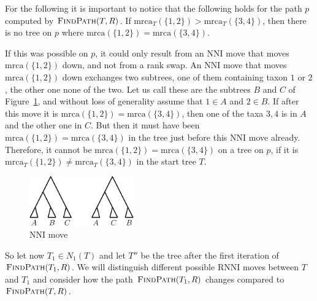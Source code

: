 \documentclass{amsart}
\newcommand{\rnni}{\mathrm{RNNI}}
\newcommand{\findpath}{\textsc{FindPath}}
\newcommand{\mrca}{\mathrm{mrca}}
\newcommand{\nni}{\mathrm{NNI}}
\begin{document}
For the following it is important to notice that the following holds for the path $p$ computed by $\findpath(T,R)$.
If $\mrca_T(\{1,2\}) > \mrca_T(\{3,4\})$, then there is no tree on $p$ where $\mrca(\{1,2\}) = \mrca(\{3,4\})$.

If this was possible on $p$, it could only result from an $\nni$ move that moves $\mrca(\{1,2\})$ down, and not from a rank swap.
An $\nni$ move that moves $\mrca(\{1,2\})$ down exchanges two subtrees, one of them containing taxon $1$ or $2$, the other one none of the two.
Let us call these are the subtrees $B$ and $C$ of Figure~\ref{fig:nni_move}, and without loss of generality assume that $1 \in A$ and $2 \in B$.
If after this move it is $\mrca(\{1,2\}) = \mrca(\{3,4\})$, then one of the taxa $3,4$ is in $A$ and the other one in $C$.
But then it must have been $\mrca(\{1,2\}) = \mrca(\{3,4\})$ in the tree just before this $\nni$ move already.
Therefore, it cannot be $\mrca(\{1,2\}) = \mrca(\{3,4\})$ on a tree on $p$, if it is $\mrca_T(\{1,2\}) \neq \mrca_T(\{3,4\})$ in the start tree $T$.


\begin{figure}[H]
\centering
\includegraphics[width=0.4\textwidth]{NNI_move}
\vspace{12pt}
\caption{$\nni$ move}
\label{fig:nni_move}
\end{figure}

So let now $T_1 \in N_1(T)$ and let $T''$ be the tree after the first iteration of $\findpath(T_1,R)$. We will distinguish different possible $\rnni$ moves between $T$ and $T_1$ and consider how the path $\findpath(T_1,R)$ changes compared to $\findpath(T,R)$.
\end{document}
